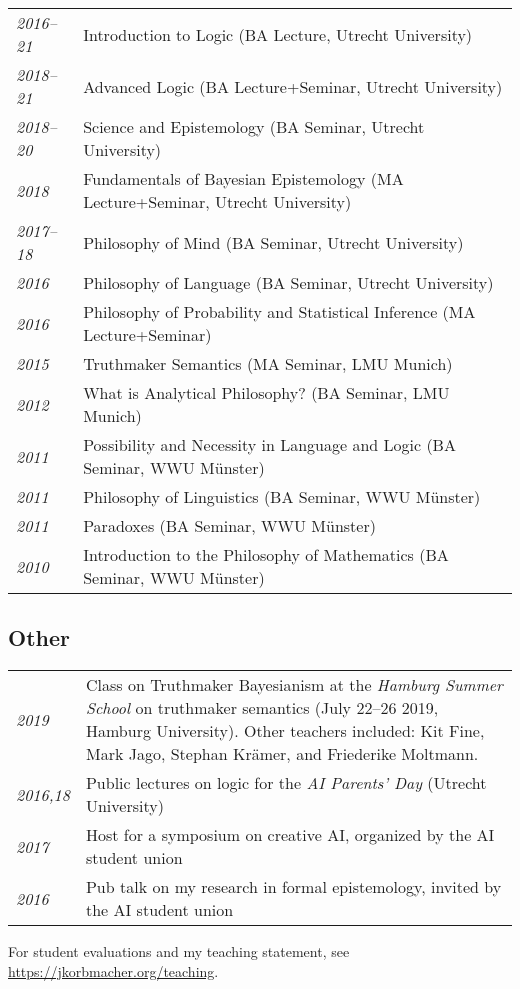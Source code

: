\begin{longtable}{p{.1\linewidth} p{.9\linewidth}}
  \emph{2016--21} & Introduction to Logic (BA Lecture, Utrecht University)\\[1ex]
  \emph{2018--21} & Advanced Logic (BA Lecture+Seminar, Utrecht University)\\[1ex]
  \emph{2018--20} & Science and Epistemology (BA Seminar, Utrecht University)\\[1ex]
  \emph{2018}     & Fundamentals of Bayesian Epistemology (MA Lecture+Seminar, Utrecht University)\\[1ex]
  \emph{2017--18} & Philosophy of Mind (BA Seminar, Utrecht University)\\[1ex]
  \emph{2016}     & Philosophy of Language (BA Seminar, Utrecht University)\\[1ex]
  \emph{2016}     & Philosophy of Probability and Statistical Inference (MA Lecture+Seminar)\\[1ex]
  \emph{2015}     & Truthmaker Semantics (MA Seminar, LMU Munich)\\[1ex]
  \emph{2012}     & What is Analytical Philosophy? (BA Seminar, LMU Munich)\\[1ex]
  \emph{2011}     & Possibility and Necessity in Language and Logic (BA Seminar, WWU M\"unster)\\[1ex]
  \emph{2011}     & Philosophy of Linguistics (BA Seminar, WWU M\"unster)\\[1ex]
  \emph{2011}     & Paradoxes (BA Seminar, WWU M\"unster)\\[1ex]
  \emph{2010}     & Introduction to the Philosophy of Mathematics (BA Seminar, WWU M\"unster)\\
\end{longtable}

\subsection*{Other}
\begin{tabular}{l p{.8\linewidth}}
  \emph{2019}    & Class on Truthmaker Bayesianism at the \emph{Hamburg Summer
                   School} on truthmaker semantics (July 22--26 2019, Hamburg University). Other
                   teachers included: Kit Fine, Mark Jago, Stephan Kr\"amer, and Friederike
                   Moltmann. \\
  \emph{2016,18} & Public lectures on logic for the \emph{AI Parents' Day} (Utrecht University)\\[1ex]
  \emph{2017}    & Host for a symposium on creative AI, organized by the AI student union\\[1ex]
  \emph{2016}    & Pub talk on my research in formal epistemology, invited by the AI student union\\
\end{tabular}

For student evaluations and my teaching statement, see \url{https://jkorbmacher.org/teaching}.

